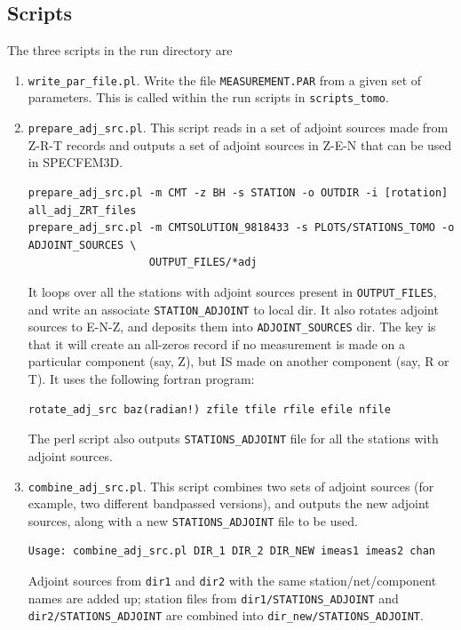 \documentclass[11pt,titlepage,fleqn]{article}
\begin{document}

\subsection{Scripts}

The three scripts in the run directory are
%
\begin{enumerate}
\item \verb+write_par_file.pl+. Write the file \verb+MEASUREMENT.PAR+ from a given set of parameters. This is called within the run scripts in \verb+scripts_tomo+.

\item \verb+prepare_adj_src.pl+. This script reads in a set of adjoint sources made from Z-R-T records and outputs a set of adjoint sources in Z-E-N that can be used in SPECFEM3D. 
\begin{verbatim}
prepare_adj_src.pl -m CMT -z BH -s STATION -o OUTDIR -i [rotation] all_adj_ZRT_files
prepare_adj_src.pl -m CMTSOLUTION_9818433 -s PLOTS/STATIONS_TOMO -o ADJOINT_SOURCES \
                   OUTPUT_FILES/*adj
\end{verbatim}
It loops over all the stations with adjoint sources present in \verb+OUTPUT_FILES+, and write an associate \verb+STATION_ADJOINT+ to local dir. It also rotates adjoint sources to E-N-Z, and deposits them into \verb+ADJOINT_SOURCES+ dir.
The key is that it will create an all-zeros record if no measurement is made on a particular component (say, Z), but IS made on another component (say, R or T). It uses the following fortran
program:
\begin{verbatim}
rotate_adj_src baz(radian!) zfile tfile rfile efile nfile
\end{verbatim}
The perl script also outputs \verb+STATIONS_ADJOINT+ file for all the stations with adjoint sources.

\item \verb+combine_adj_src.pl+. This script combines two sets of adjoint sources (for example, two different bandpassed versions), and outputs the new adjoint sources, along with a new \verb+STATIONS_ADJOINT+ file to be used.
\begin{verbatim}
Usage: combine_adj_src.pl DIR_1 DIR_2 DIR_NEW imeas1 imeas2 chan
\end{verbatim}
Adjoint sources from \verb+dir1+ and \verb+dir2+ with the same station/net/component names are added up; station files 
from \verb+dir1/STATIONS_ADJOINT+ and \verb+dir2/STATIONS_ADJOINT+ are combined into \verb+dir_new/STATIONS_ADJOINT+.
\end{enumerate}
%
\end{document}
